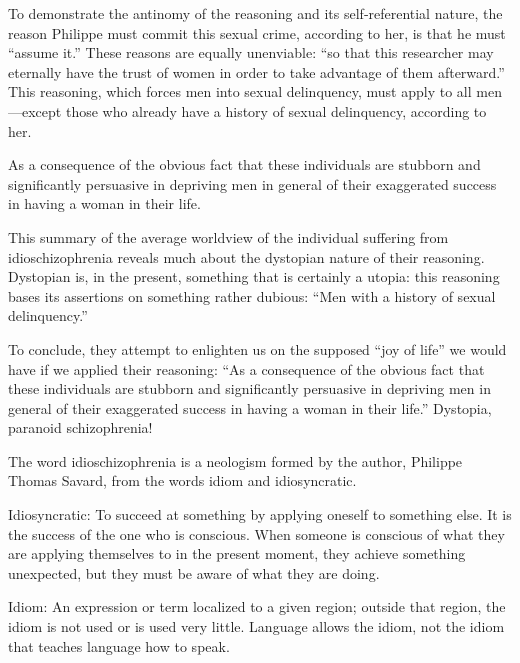 \documentclass[12pt,oneside]{article}
\begin{document}
To demonstrate the antinomy of the reasoning and its self‑referential nature, the reason Philippe must commit this sexual crime, according to her, is that he must “assume it.” These reasons are equally unenviable: “so that this researcher may eternally have the trust of women in order to take advantage of them afterward.” This reasoning, which forces men into sexual delinquency, must apply to all men—except those who already have a history of sexual delinquency, according to her.

As a consequence of the obvious fact that these individuals are stubborn and significantly persuasive in depriving men in general of their exaggerated success in having a woman in their life.

This summary of the average worldview of the individual suffering from idioschizophrenia reveals much about the dystopian nature of their reasoning. Dystopian is, in the present, something that is certainly a utopia: this reasoning bases its assertions on something rather dubious: “Men with a history of sexual delinquency.”

To conclude, they attempt to enlighten us on the supposed “joy of life” we would have if we applied their reasoning: “As a consequence of the obvious fact that these individuals are stubborn and significantly persuasive in depriving men in general of their exaggerated success in having a woman in their life.” Dystopia, paranoid schizophrenia!

The word idioschizophrenia is a neologism formed by the author, Philippe Thomas Savard, from the words idiom and idiosyncratic.

Idiosyncratic: To succeed at something by applying oneself to something else. It is the success of the one who is conscious. When someone is conscious of what they are applying themselves to in the present moment, they achieve something unexpected, but they must be aware of what they are doing.

Idiom: An expression or term localized to a given region; outside that region, the idiom is not used or is used very little. Language allows the idiom, not the idiom that teaches language how to speak.
\end{document}
